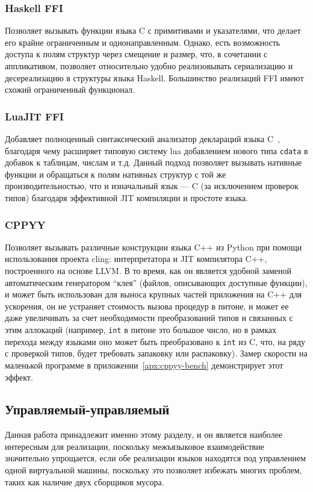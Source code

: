 \documentclass[times,specification,annotation]{itmo-student-thesis}
\begin{document}
\subsubsection{Haskell FFI}
Позволяет вызывать функции языка C с примитивами и указателями, что делает его крайне ограниченным и однонаправленным. Однако, есть возможность доступа к полям структур через смещение и размер, что, в сочетании с аппликативом, позволяет относительно удобно реализовывать сериализацию и десереализацию в структуры языка Haskell. Большинство реализаций FFI имеют схожий ограниченный функционал.
\subsubsection{LuaJIT FFI}\label{intro:luajitffi}
Добавляет полноценный синтаксический анализатор деклараций языка C~\cite{luajit}, благодаря чему расширяет типовую систему lua добавлением нового типа \texttt{cdata} в добавок к таблицам, числам и т.д. Данный подход позволяет вызывать нативные функции и обращаться к полям нативных структур с той же производительностью, что и изначальный язык --- C (за исключением проверок типов) благодаря эффективной JIT компиляции и простоте языка.
\subsubsection{CPPYY}
Позволяет вызывать различные конструкции языка C++ из Python при помощи использования проекта cling: интерпретатора и JIT компилятора C++, построенного на основе LLVM. В то время, как он является удобной заменой автоматическим генератором ``клея'' (файлов, описывающих доступные функции), и может быть использован для выноса крупных частей приложения на C++ для ускорения, он не устраняет стоимость вызова процедур в питоне, и может ее даже увеличивать за счет необходимости преобразований типов и связанных с этим аллокаций (например, \texttt{int} в питоне это большое число, но в рамках перехода между языками оно может быть преобразовано к \texttt{int} из C, что, на ряду с проверкой типов, будет требовать запаковку или распаковку). Замер скорости на маленькой программе в приложении~\ref{apx:cppyy-bench} демонстрирует этот эффект.

\subsection{Управляемый-управляемый}
Данная работа принадлежит именно этому разделу, и он является наиболее интересным для реализации, поскольку межъязыковое взаимодействие значительно упрощается, если обе реализации языков находятся под управлением одной виртуальной машины, поскольку это позволяет избежать многих проблем, таких как наличие двух сборщиков мусора.
\end{document}
